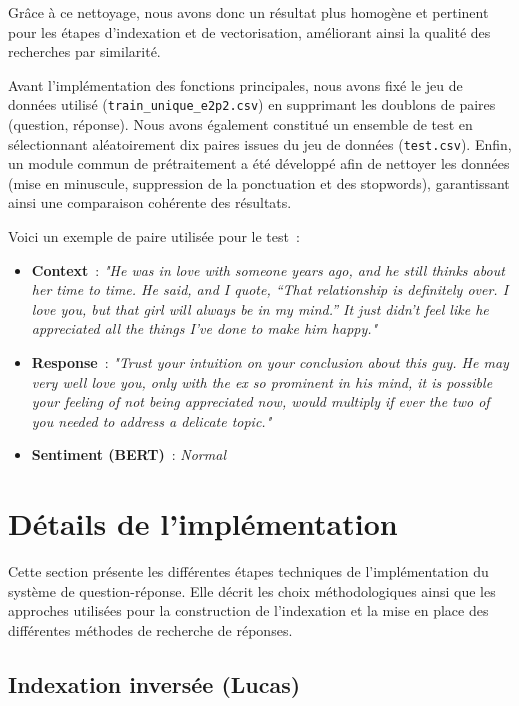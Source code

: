 \documentclass[12pt,a4paper]{report}
\begin{document}
Grâce à ce nettoyage, nous avons donc un résultat plus homogène et pertinent pour les étapes d'indexation et de vectorisation, améliorant ainsi la qualité des recherches par similarité.

Avant l'implémentation des fonctions principales, nous avons fixé le jeu de données utilisé
(\texttt{train\_unique\_e2p2.csv}) en supprimant les doublons de paires (question, réponse). Nous
avons également constitué un ensemble de test en sélectionnant aléatoirement dix paires
issues du jeu de données (\texttt{test.csv}). Enfin, un module commun de prétraitement a été développé afin de nettoyer les données (mise en minuscule, suppression de la
ponctuation et des stopwords), garantissant ainsi une comparaison cohérente des résultats.

Voici un exemple de paire utilisée pour le test~:
\begin{itemize}
  \item \textbf{Context}~: \textit{"He was in love with someone years ago, and he still thinks about her time to time. He said, and I quote, ``That relationship is definitely over. I love you, but that girl will always be in my mind.'' It just didn't feel like he appreciated all the things I've done to make him happy."}
  \item \textbf{Response}~: \textit{"Trust your intuition on your conclusion about this guy. He may very well love you, only with the ex so prominent in his mind, it is possible your feeling of not being appreciated now, would multiply if ever the two of you needed to address a delicate topic."}
  \item \textbf{Sentiment (BERT)}~: \textit{Normal}
\end{itemize}

\section{Détails de l'implémentation}

Cette section présente les différentes étapes techniques de l'implémentation du système de question-réponse. Elle décrit les choix méthodologiques ainsi que les approches utilisées pour la construction de l'indexation et la mise en place des différentes méthodes de recherche de réponses.

\subsection{Indexation inversée (Lucas)}
\end{document}
